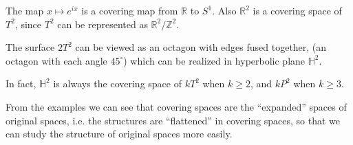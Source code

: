 \begin{example}
    The map $x\mapsto e^{ix}$ is a covering map from $\mathbb{R}$ to $S^1$.
	Also $\mathbb{R}^2$ is a covering space of $T^2$, since
	$T^2$ can be represented as $\mathbb{R}^2 / \mathbb{Z}^2$.
\end{example}

\begin{example}
    The surface $2T^2$ can be viewed as an octagon with edges fused together,
	(an octagon with each angle $45^\circ$)
	which can be realized in hyperbolic plane $\mathbb{H}^2$.

	In fact, $\mathbb{H}^2$ is always the covering space of $kT^2$ when $k\ge 2$,
	and $kP^2$ when $k\ge 3$.
\end{example}

From the examples we can see that covering spaces are the ``expanded'' spaces
of original spaces, i.e. the structures are ``flattened'' in covering spaces,
so that we can study the structure of original spaces more easily.

